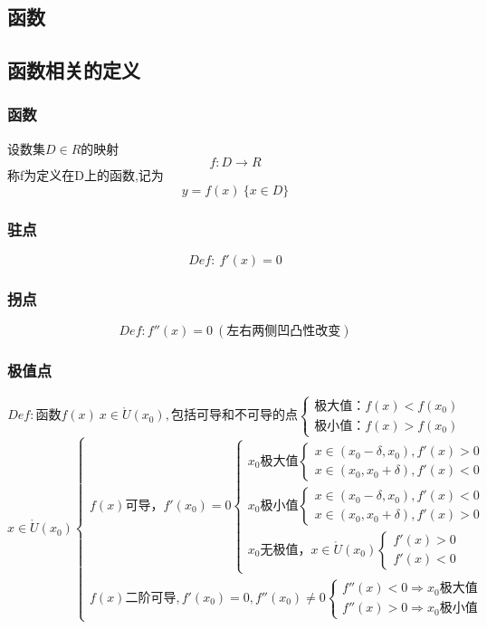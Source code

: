\begin{center}\section{函数}\label{chapter_function}\end{center}
\subsection{函数相关的定义}
\subsubsection{函数}
设数集$D\in R$的映射
$$f: D\rightarrow R$$
称f为定义在D上的函数,记为
$$y = f(x)\ \{x\in D\}$$
\subsubsection{驻点}
$$Def:\ f'(x)=0$$
\subsubsection{拐点}
$$Def:f''(x)=0\ (\mbox{左右两侧凹凸性改变})$$
\subsubsection{极值点}
$$Def:\mbox{函数}f(x)\ x\in \mathring{U}(x_0),\mbox{包括可导和不可导的点} \begin{cases}
    \mbox{极大值：}f(x)<f(x_0)\\
    \mbox{极小值：}f(x)>f(x_0)
\end{cases}$$
$$x\in \mathring{U}(x_0)\begin{cases}
    f(x)\mbox{可导，}f'(x_0)=0\begin{cases}x_0\mbox{极大值}
        \begin{cases}
            x\in (x_0-\delta ,x_0),f'(x)>0\\
            x\in (x_0 ,x_0+\delta),f'(x)<0
        \end{cases}\\
    x_0\mbox{极小值}\begin{cases}
        x\in (x_0-\delta ,x_0),f'(x)<0\\
        x\in (x_0 ,x_0+\delta),f'(x)>0
        \end{cases}\\
        x_0\mbox{无极值，}x\in \mathring{U}(x_0)\begin{cases}
            f'(x)>0\\
            f'(x)<0
        \end{cases}
    \end{cases}\\
    f(x)\mbox{二阶可导},f'(x_0)=0,f''(x_0)\neq0
    \begin{cases}f''(x)<0\Rightarrow x_0\mbox{极大值}\\
        f''(x)>0\Rightarrow x_0\mbox{极小值}
    \end{cases}
\end{cases}$$
